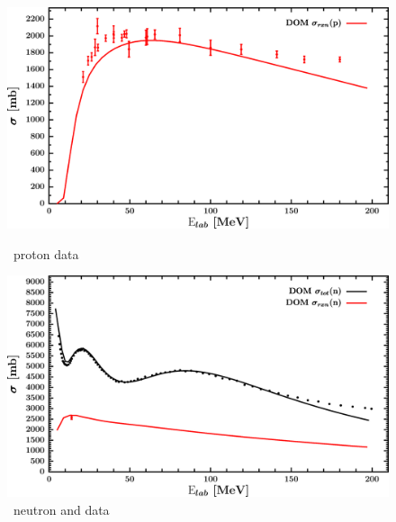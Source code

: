 \begin{figure}[H]
    \centering
    \begin{minipage}{0.45\textwidth}
        \centering
        \includegraphics[width=1.0\textwidth]{figures/pb208_protonInelastic.png}
        \caption{\pbEight\ proton \rxn data}
        \label{DOMFitData_pb208_proton_inelastic}
    \end{minipage}\hfill
    \begin{minipage}{0.45\textwidth}
        \centering
        \includegraphics[width=1.0\textwidth]{figures/pb208_neutronInelastic.png}
        \caption{\pbEight\ neutron \rxn and \tot data}
        \label{DOMFitData_pb208_neutron_inelastic}
    \end{minipage}
\end{figure}

\afterpage{\clearpage}

